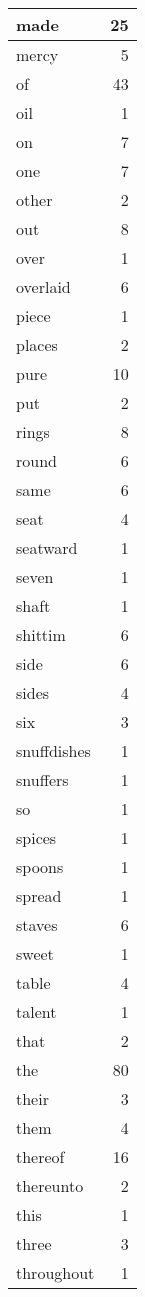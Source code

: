\begin{center}
\begin{longtable}{l|r}
made & 25 \\ \hline
mercy & 5 \\ \hline
of & 43 \\ \hline
oil & 1 \\ \hline
on & 7 \\ \hline
one & 7 \\ \hline
other & 2 \\ \hline
out & 8 \\ \hline
over & 1 \\ \hline
overlaid & 6 \\ \hline
piece & 1 \\ \hline
places & 2 \\ \hline
pure & 10 \\ \hline
put & 2 \\ \hline
rings & 8 \\ \hline
round & 6 \\ \hline
same & 6 \\ \hline
seat & 4 \\ \hline
seatward & 1 \\ \hline
seven & 1 \\ \hline
shaft & 1 \\ \hline
shittim & 6 \\ \hline
side & 6 \\ \hline
sides & 4 \\ \hline
six & 3 \\ \hline
snuffdishes & 1 \\ \hline
snuffers & 1 \\ \hline
so & 1 \\ \hline
spices & 1 \\ \hline
spoons & 1 \\ \hline
spread & 1 \\ \hline
staves & 6 \\ \hline
sweet & 1 \\ \hline
table & 4 \\ \hline
talent & 1 \\ \hline
that & 2 \\ \hline
the & 80 \\ \hline
their & 3 \\ \hline
them & 4 \\ \hline
thereof & 16 \\ \hline
thereunto & 2 \\ \hline
this & 1 \\ \hline
three & 3 \\ \hline
throughout & 1 \\ \hline

\end{longtable}
\end{center}
